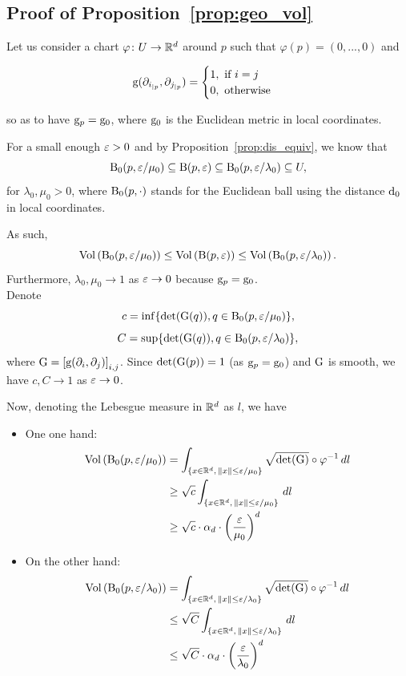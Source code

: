 \subsection{Proof of Proposition~\ref{prop:geo_vol}}
Let us consider a chart $\varphi\colon U\rightarrow\mathbb{R}^d$ around $p$ such that $\varphi(p)=(0,...,0)$ and 

$$\mathrm{g}(\partial_{i_{|p}},\partial_{j_{|p}})=
\begin{cases}
1, \text{ if } i=j\\
0, \text{ otherwise}
\end{cases}$$

so as to have $\mathrm{g}_p=\mathrm{g}_0$, where $\mathrm{g}_0$ is the Euclidean metric in local coordinates.

For a small enough $\varepsilon>0$ and by Proposition~\ref{prop:dis_equiv}, we know that 
$${\mathrm {B}}_0(p,\varepsilon/\mu_0)\subseteq{\mathrm {B}}(p,\varepsilon)\subseteq {\mathrm {B}}_0(p,\varepsilon/\lambda_0)\subseteq U,$$
for $\lambda_0,\mu_0>0$, where ${\mathrm {B}}_0(p,\cdot)$ stands for the Euclidean ball using the distance $\mathrm{d}_0$ in local coordinates.

As such,
$$\mathrm{Vol}\left({\mathrm {B}}_0(p,\varepsilon/\mu_0)\right)\leq \mathrm{Vol}\left({\mathrm {B}}(p,\varepsilon)\right)\leq \mathrm{Vol}\left({\mathrm {B}}_0(p,\varepsilon/\lambda_0)\right).$$
Furthermore, $\lambda_0,\mu_0\rightarrow 1$ as $\varepsilon\rightarrow 0$ because $\mathrm{g}_p=\mathrm{g}_0$.\\
Denote
$$c=\inf\{\mathrm{det}(\mathrm{G}(q)),q\in{\mathrm {B}}_0(p,\varepsilon/\mu_0)\},$$
$$C=\sup\{\mathrm{det}(\mathrm{G}(q)),q\in{\mathrm {B}}_0(p,\varepsilon/\lambda_0)\},$$
where $\mathrm{G}=\left[\mathrm{g}(\partial_i,\partial_j)\right]_{i,j}$.
Since $\mathrm{det}(\mathrm{G}(p))=1$ (as $\mathrm{g}_p=\mathrm{g}_0$) and $\mathrm{G}$ is smooth, we have $c,C\rightarrow 1$ as $\varepsilon\rightarrow 0$.

Now, denoting the Lebesgue measure in $\mathbb{R}^d$ as $l$, we have
\begin{itemize}
\item One one hand: \begin{align*}
\mathrm{Vol}\left({\mathrm {B}}_0(p,\varepsilon/\mu_0)\right)&=\int_{\{x\in\mathbb{R}^d,\,\Vert x\Vert\leq \varepsilon/\mu_0\}}\sqrt{\mathrm{det}(\mathrm{G})}\circ\varphi^{-1}\,dl\\
&\geq \sqrt{c}\int_{\{x\in\mathbb{R}^d,\,\Vert x\Vert\leq \varepsilon/\mu_0\}}\,dl\\
&\geq \sqrt{c}\cdot\alpha_d\cdot \left(\frac{\varepsilon}{\mu_0}\right)^d
\end{align*}

\item On the other hand:\begin{align*}
\mathrm{Vol}\left({\mathrm {B}}_0(p,\varepsilon/\lambda_0)\right)&=\int_{\{x\in\mathbb{R}^d,\,\Vert x\Vert\leq \varepsilon/\lambda_0\}}\sqrt{\mathrm{det}(\mathrm{G})}\circ\varphi^{-1}\,dl\\
&\leq \sqrt{C}\int_{\{x\in\mathbb{R}^d,\,\Vert x\Vert\leq \varepsilon/\lambda_0\}}\,dl\\
&\leq \sqrt{C}\cdot \alpha_d\cdot \left(\frac{\varepsilon}{\lambda_0}\right)^d
\end{align*}
\end{itemize}

